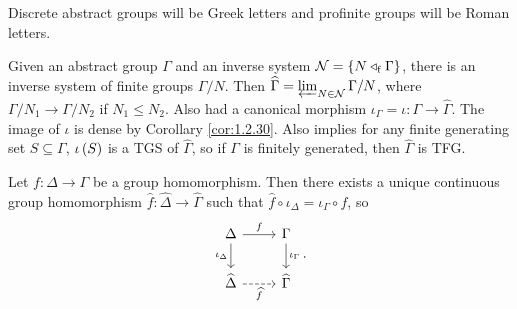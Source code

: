 \begin{notation*}
Discrete abstract groups will be Greek letters and profinite groups will be Roman letters.
\end{notation*}

Given an abstract group $ \Gamma $ and an inverse system $ \NNN = \cbr{N \triangleleft_\f \Gamma} $, there is an inverse system of finite groups $ \Gamma / N $. Then $ \widehat{\Gamma} = \varprojlim_{N \in \mathcal{N}} \Gamma / N $, where $ \Gamma / N_1 \to \Gamma / N_2 $ if $ N_1 \le N_2 $. Also had a canonical morphism $ \iota_\Gamma = \iota : \Gamma \to \widehat{\Gamma} $. The image of $ \iota $ is dense by Corollary \ref{cor:1.2.30}. Also implies for any finite generating set $ S \subseteq \Gamma $, $ \iota\br{S} $ is a TGS of $ \widehat{\Gamma} $, so if $ \Gamma $ is finitely generated, then $ \widehat{\Gamma} $ is TFG.

\begin{proposition}
\label{prop:3.1.2}
Let $ f : \Delta \to \Gamma $ be a group homomorphism. Then there exists a unique continuous group homomorphism $ \widehat{f} : \widehat{\Delta} \to \widehat{\Gamma} $ such that $ \widehat{f} \circ \iota_\Delta = \iota_\Gamma \circ f $, so
$$
\begin{tikzcd}
\Delta \arrow{r}{f} \arrow{d}[swap]{\iota_\Delta} & \Gamma \arrow{d}{\iota_\Gamma} \\
\widehat{\Delta} \arrow[dashed]{r}[swap]{\widehat{f}} & \widehat{\Gamma}
\end{tikzcd}.
$$
\end{proposition}

